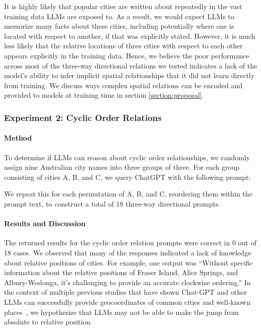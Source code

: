 It is highly likely that popular cities are written about repeatedly in the vast training data LLMs are exposed to.
As a result, we would expect LLMs to memorize many facts about these cities, including potentially where one is located with respect to another, if that was explicitly stated.
However, it is much less likely that the relative locations of three cities with respect to each other appears explicitly in the training data.
Hence, we believe the poor performance across most of the three-way directional relations we tested indicates a lack of the model's ability to infer implicit spatial relationships that it did not learn directly from training.
We discuss ways complex spatial relations can be encoded and provided to models at training time in section \ref{section:proposal}.


\subsubsection{Experiment 2: Cyclic Order Relations}
\paragraph{Method}
To determine if LLMs can reason about cyclic order relationships, we randomly assign nine Australian city names into three groups of three.
For each group consisting of cities A, B, and C, we query ChatGPT with the following prompt: 
\begin{center}
\end{center}
We repeat this for each permutation of A, B, and C, reordering them within the prompt text, to construct a total of 18 three-way directional prompts.

\paragraph{Results and Discussion}
The returned results for the cyclic order relation prompts were correct in 0 out of 18 cases.
We observed that many of the responses indicated a lack of knowledge about relative positions of cities.
For example, one output was 
``Without specific information about the relative positions of Fraser Island, Alice Springs, and Albury-Wodonga, it's challenging to provide an accurate clockwise ordering.''
In the context of multiple previous studies that have shown Chat-GPT and other LLMs can successfully provide geocoordinates of common cities and well-known places~\cite{Bhandari2023,Qi2023}, we hypothesize that LLMs may not be able to make the jump from absolute to relative position. 


